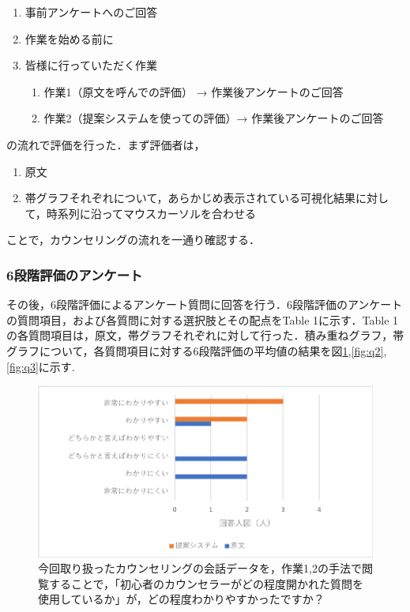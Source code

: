 \documentclass[shuuron]{kuee}
\begin{document}
\begin{enumerate}

  \item 事前アンケートへのご回答
  \item 作業を始める前に
  \item 皆様に行っていただく作業
  \begin{enumerate}
    \item 作業1（原文を呼んでの評価） → 作業後アンケートのご回答
    \item 作業2（提案システムを使っての評価）→ 作業後アンケートのご回答
  \end{enumerate}
\end{enumerate}
の流れで評価を行った．まず評価者は，
\begin{enumerate}

  \item 原文
  \item 帯グラフそれぞれについて，あらかじめ表示されている可視化結果に対して，時系列に沿ってマウスカーソルを合わせる
\end{enumerate}
ことで，カウンセリングの流れを一通り確認する．




\subsubsection{6段階評価のアンケート}

その後，6段階評価によるアンケート質問に回答を行う．6段階評価のアンケートの質問項目，および各質問に対する選択肢とその配点をTable 1に示す．Table 1の各質問項目は，原文，帯グラフそれぞれに対して行った．積み重ねグラフ，帯グラフについて，各質問項目に対する6段階評価の平均値の結果を図\ref{fig:q1},\ref{fig:q2},\ref{fig:q3}に示す.



\begin{figure}
  \begin{center}
    \includegraphics[width=\linewidth]{q1.png}
  \end{center}
  \caption{今回取り扱ったカウンセリングの会話データを，作業1,2の手法で閲覧することで，「初心者のカウンセラーがどの程度開かれた質問を使用しているか」が，どの程度わかりやすかったですか？}
  \label{fig:q1}
\end{figure}
\end{document}
